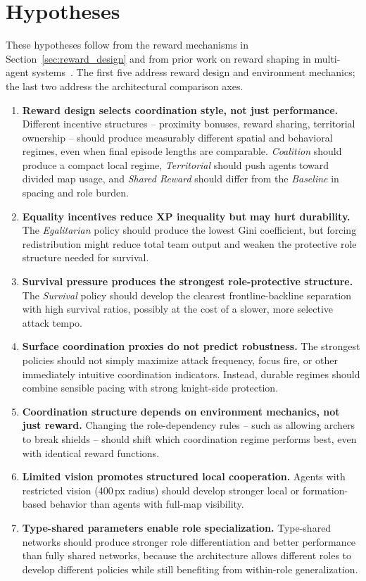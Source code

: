 \section{Hypotheses}

These hypotheses follow from the reward mechanisms in Section~\ref{sec:reward_design} and from prior work on reward shaping in multi-agent systems~\cite{leibo2017ssd}. The first five address reward design and environment mechanics; the last two address the architectural comparison axes.

\begin{enumerate}
  \item \textbf{Reward design selects coordination style, not just performance.} Different incentive structures -- proximity bonuses, reward sharing, territorial ownership -- should produce measurably different spatial and behavioral regimes, even when final episode lengths are comparable. \textit{Coalition} should produce a compact local regime, \textit{Territorial} should push agents toward divided map usage, and \textit{Shared Reward} should differ from the \textit{Baseline} in spacing and role burden.

  \item \textbf{Equality incentives reduce XP inequality but may hurt durability.} The \textit{Egalitarian} policy should produce the lowest Gini coefficient, but forcing redistribution might reduce total team output and weaken the protective role structure needed for survival.

  \item \textbf{Survival pressure produces the strongest role-protective structure.} The \textit{Survival} policy should develop the clearest frontline-backline separation with high survival ratios, possibly at the cost of a slower, more selective attack tempo.

  \item \textbf{Surface coordination proxies do not predict robustness.} The strongest policies should not simply maximize attack frequency, focus fire, or other immediately intuitive coordination indicators. Instead, durable regimes should combine sensible pacing with strong knight-side protection.

  \item \textbf{Coordination structure depends on environment mechanics, not just reward.} Changing the role-dependency rules -- such as allowing archers to break shields -- should shift which coordination regime performs best, even with identical reward functions.

  \item \textbf{Limited vision promotes structured local cooperation.} Agents with restricted vision (400\,px radius) should develop stronger local or formation-based behavior than agents with full-map visibility.

  \item \textbf{Type-shared parameters enable role specialization.} Type-shared networks should produce stronger role differentiation and better performance than fully shared networks, because the architecture allows different roles to develop different policies while still benefiting from within-role generalization.
\end{enumerate}

